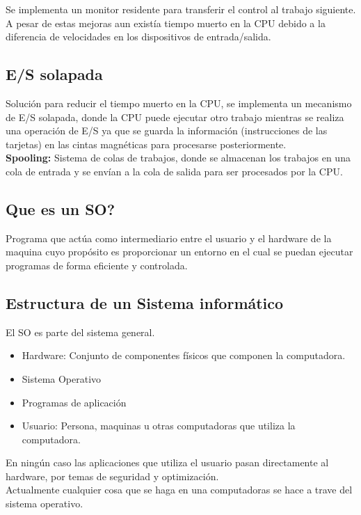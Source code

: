 \documentclass{templateNote}
\begin{document}
Se implementa un monitor residente para transferir el control al trabajo siguiente. A pesar de estas mejoras aun existía tiempo muerto en la CPU debido a la diferencia de velocidades en los dispositivos de entrada/salida.

\subsection*{E/S solapada}

Solución para reducir el tiempo muerto en la CPU, se implementa un mecanismo de E/S solapada, donde la CPU puede ejecutar otro trabajo mientras se realiza una operación de E/S ya que se guarda la información (instrucciones de las tarjetas) en las cintas magnéticas para procesarse posteriormente.
\\\textbf{Spooling:} Sistema de colas de trabajos, donde se almacenan los trabajos en una cola de entrada y se envían a la cola de salida para ser procesados por la CPU.

\subsection*{Que es un SO?}
Programa que actúa como intermediario entre el usuario y el hardware de la maquina cuyo propósito es proporcionar un entorno en el cual se puedan ejecutar programas de forma eficiente y controlada.


\subsection*{Estructura de un Sistema informático}
\noindent El SO es parte del sistema general.
\begin{itemize}
    \item Hardware: Conjunto de componentes físicos que componen la computadora.
    \item Sistema Operativo
    \item Programas de aplicación
    \item Usuario: Persona, maquinas u otras computadoras que utiliza la computadora.
\end{itemize}

En ningún caso las aplicaciones que utiliza el usuario pasan directamente al hardware, por temas de seguridad y optimización. 
\\Actualmente cualquier cosa que se haga en una computadoras se hace a trave del sistema operativo.
\end{document}
